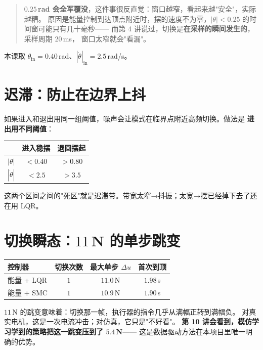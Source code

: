 \begin{quote}
\textbf{$0.25$\,rad 会全军覆没}，这件事很反直觉：窗口越窄，看起来越"安全"，实际越糟。
原因是能量控制到达顶点附近时，摆的速度不为零，$|\theta|<0.25$ 的时间窗可能只有几十毫秒——
而第 4 讲说过，切换是\textbf{在采样的瞬间发生的}，采样周期 $20$\,ms，
窗口太窄就会"看漏"。
\end{quote}

本课取 $\theta_{\mathrm{in}}=0.40$\,rad、$|\dot\theta|_{\mathrm{in}}=2.5$\,rad/s。

\section{迟滞：防止在边界上抖}

如果进入和退出用同一组阈值，噪声会让模式在临界点附近高频切换。做法是
\textbf{进出用不同阈值}：

\begin{center}
\small
\begin{tabular}{@{}lcc@{}}
\toprule
 & 进入稳摆 & 退回摆起 \\
\midrule
$|\theta|$ & $<0.40$ & $>0.80$ \\
$|\dot\theta|$ & $<2.5$ & $>3.5$ \\
\bottomrule
\end{tabular}
\end{center}

这两个区间之间的"死区"就是迟滞带。带宽太窄→抖振；太宽→摆已经掉下去了还在用 LQR。

\section{切换瞬态：$11$\,N 的单步跳变}

\begin{center}
\small
\begin{tabular}{@{}lccc@{}}
\toprule
控制器 & 切换次数 & 最大单步 $\Delta u$ & 首次到顶 \\
\midrule
能量 + LQR & $1$ & $11.0$\,N & $1.98$\,s \\
能量 + SMC & $1$ & $10.9$\,N & $1.90$\,s \\
\bottomrule
\end{tabular}
\end{center}

$11$\,N 的跳变意味着：切换那一帧，执行器的指令几乎从满幅正转到满幅负。
对真实电机，这是一次电流冲击；对仿真，它只是"不好看"。
\textbf{第 10 讲会看到，模仿学习学到的策略把这一跳变压到了 $5.4$\,N}——
这是数据驱动方法在本项目里唯一明确的优势。

